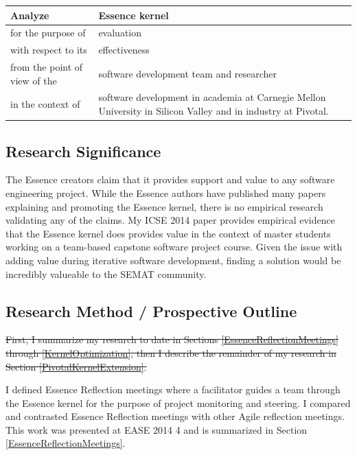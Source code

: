 \documentclass[preprint,12pt,3p]{elsarticle}
\begin{document}
\begin{table}[h]
\centering
\begin{tabular}{|p{2.00in}|p{4.10in}|}
\hline
Analyze & Essence kernel  \\ \hline
for the purpose of & evaluation \\ \hline
with respect to its & effectiveness \\ \hline
from the point of view of the & software development team and researcher \\ \hline
in the context of & software development in academia at Carnegie Mellon University in Silicon Valley and in industry at Pivotal. \\
\hline
\end{tabular}
\end{table}

\subsection{Research Significance}

The Essence creators claim that it provides support and value to any software engineering project. While the Essence authors have published many papers explaining and promoting the Essence kernel, there is no empirical research validating any of the claims. My ICSE 2014 paper provides empirical evidence that the Essence kernel does provides value in the context of master students working on a team-based capstone software project course. Given the issue with adding value during iterative software development, finding a solution would be incredibly valueable to the SEMAT community.


\subsection{Research Method / Prospective Outline}

\sout{First, I summarize my research to date in Sections \ref{EssenceReflectionMeetings} through \ref{KernelOptimization}, then I describe the remainder of my research in Section \ref{PivotalKernelExtension}.}

I defined Essence Reflection meetings where a facilitator guides a team through the Essence kernel for the purpose of project monitoring and steering. I compared and contrasted Essence Reflection meetings with other Agile reflection meetings. This work was presented at EASE 2014 \cite{EASE201}4 and is summarized in Section \ref{EssenceReflectionMeetings}.
\end{document}
